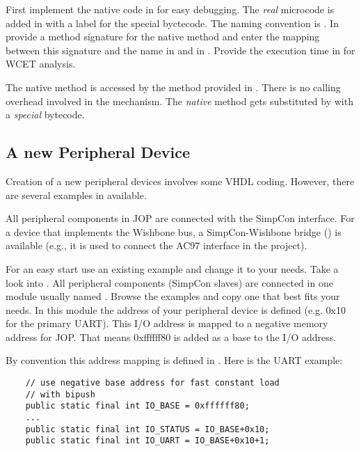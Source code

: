 First implement the native code in  for easy
debugging. The \emph{real} microcode is added in  with
a label for the special byctecode. The naming convention is
. In  provide a method signature
for the native method and enter the mapping between this signature
and the name in  and in . Provide
the execution time in  for WCET analysis.

The native method is accessed by the method provided in
. There is no calling overhead involved in the
mechanism. The \emph{native} method gets substituted by
 with a \emph{special} bytecode.

\subsection{A new Peripheral Device}

Creation of a new peripheral devices involves some VHDL coding.
However, there are several examples in 
available.

All peripheral components in JOP are connected with the SimpCon
\cite{simpcon} interface. For a device that implements the Wishbone
\cite{soc:wishbone} bus, a SimpCon-Wishbone bridge ()
is available (e.g., it is used to connect the AC97 interface in the
 project).

For an easy start use an existing example and change it to your
needs. Take a look into . All peripheral
components (SimpCon slaves) are connected in one module usually named
. Browse the examples and copy one that best fits
your needs. In this module the address of your peripheral device is
defined (e.g. 0x10 for the primary UART). This I/O address is mapped
to a negative memory address for JOP. That means 0xffffff80 is added
as a base to the I/O address.

By convention this address mapping is defined in
. Here is the UART example:

\begin{lstlisting}
    // use negative base address for fast constant load
    // with bipush
    public static final int IO_BASE = 0xffffff80;
    ...
    public static final int IO_STATUS = IO_BASE+0x10;
    public static final int IO_UART = IO_BASE+0x10+1;
\end{lstlisting}

